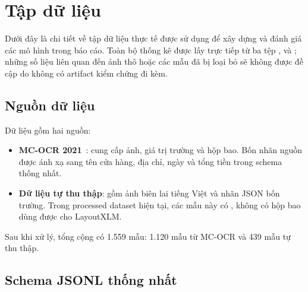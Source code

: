 \section{Tập dữ liệu}
\label{sec:dataset}

Dưới đây là chi tiết về tập dữ liệu thực tế được sử dụng để xây dựng và đánh giá các mô hình trong báo cáo. Toàn bộ thống kê được lấy trực tiếp từ ba tệp ,  và ; những số liệu liên quan đến ảnh thô hoặc các mẫu đã bị loại bỏ sẽ không được đề cập do không có artifact kiểm chứng đi kèm.

\subsection{Nguồn dữ liệu}
\label{subsec:data-source}

Dữ liệu gồm hai nguồn:
\begin{itemize}
  \item \textbf{MC-OCR 2021}~\cite{mcocr2021}: cung cấp ảnh, giá trị trường và hộp bao. Bốn nhãn nguồn được ánh xạ sang tên cửa hàng, địa chỉ, ngày và tổng tiền trong schema thống nhất.
  \item \textbf{Dữ liệu tự thu thập}: gồm ảnh biên lai tiếng Việt và nhãn JSON bốn trường. Trong processed dataset hiện tại, các mẫu này có , không có hộp bao dùng được cho LayoutXLM.
\end{itemize}

Sau khi xử lý, tổng cộng có 1.559 mẫu: 1.120 mẫu từ MC-OCR và 439 mẫu tự thu thập.

\subsection{Schema JSONL thống nhất}
\label{subsec:unified-schema}

